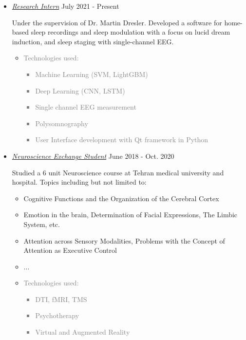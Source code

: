 \documentclass[10pt,a4paper,sans]{moderncv} %
\begin{document}
    \begin{itemize}
		\item \href{https://dreslerlab.org/}{ \emph{Research Intern}}  \hfill July 2021 - Present

        Under the supervision of Dr. Martin Dresler. Developed a software for home-based sleep recordings and sleep modulation with a focus on lucid dream induction, and sleep staging with single-channel EEG.
		\begin{itemize}
            \item \textcolor{gray}{ Technologies used:
            \begin{itemize}
				\item Machine Learning (SVM, LightGBM)
                \item Deep Learning (CNN, LSTM)
				\item Single channel EEG measurement
				\item Polysomnography
				\item User Interface development with Qt framework in Python
			\end{itemize} }
		\end{itemize}
    \end{itemize}

	\begin{itemize}
		\item \href{https://www.amazon.com/Neuroscience-Dale-Purves/dp/1605353809}{ \emph{Neuroscience Exchange Student}}  \hfill June 2018 - Oct. 2020

        Studied a 6 unit Neuroscience course at Tehran medical university and hospital. Topics including but not limited to:
		\begin{itemize}
			\item Cognitive Functions and the Organization of the Cerebral Cortex
			\item Emotion in the brain, Determination of Facial Expressions, The Limbic System, etc.
			\item Attention across Sensory Modalities, Problems with the Concept of Attention as Executive Control
            \item ...
            \item \textcolor{gray}{ Technologies used:
            \begin{itemize}
				\item DTI, fMRI, TMS
				\item Psychotherapy
				\item Virtual and Augmented Reality
			\end{itemize} }
		\end{itemize}
    \end{itemize}
\end{document}
